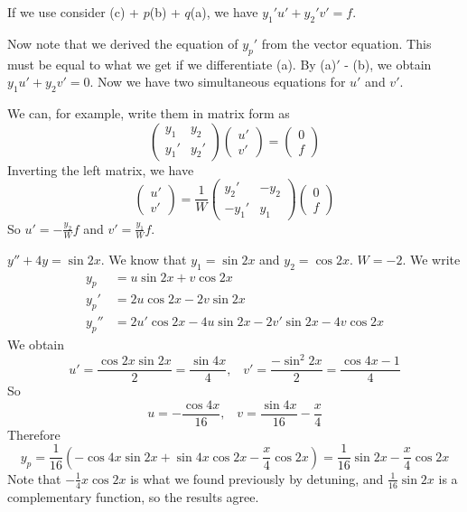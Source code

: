 \documentclass[a4paper]{article}
\begin{document}
If we use consider (c) + $p$(b) + $q$(a), we have $y_1' u' + y_2'v' = f$.

Now note that we derived the equation of $y_p'$ from the vector equation. This must be equal to what we get if we differentiate (a). By (a)$'$ - (b), we obtain $y_1u' + y_2v' = 0$. Now we have two simultaneous equations for $u'$ and $v'$.

We can, for example, write them in matrix form as
\[
\begin{pmatrix}
  y_1 & y_2\\
  y_1' & y_2'
\end{pmatrix}
\begin{pmatrix}
  u'\\
  v'
\end{pmatrix}
=
\begin{pmatrix}
  0\\
  f
\end{pmatrix}
\]
Inverting the left matrix, we have
\[
\begin{pmatrix}
  u'\\
  v'
\end{pmatrix} = \frac{1}{W}
\begin{pmatrix}
  y_2' & -y_2\\
  -y_1' & y_1
\end{pmatrix}
\begin{pmatrix}
  0\\f
\end{pmatrix}
\]
So $u' = -\frac{y_2}{W}f$ and $v' = \frac{y_1}{W}f$.

\begin{eg}
  $y'' + 4y = \sin 2x$. We know that $y_1 = \sin 2x$ and $y_2 = \cos 2x$. $W = -2$. We write
\begin{align*}
  y_p &= u\sin 2x + v\cos 2x\\
  y_p' &= 2u\cos 2x - 2v\sin 2x\\
  y_p'' &= 2u'\cos 2x - 4u\sin 2x - 2v' \sin 2x - 4v\cos 2x
\end{align*}
We obtain 
\[
u' = \frac{\cos 2x\sin 2x}{2} = \frac{\sin 4x}{4},\;\;\; v' = \frac{-\sin^2 2x}{2} = \frac{\cos 4x - 1}{4}
\]
So 
\[
u = -\frac{\cos 4x}{16}, \;\;\; v = \frac{\sin 4x}{16} - \frac{x}{4}
\]
Therefore
\[
y_p = \frac{1}{16}(-\cos 4x\sin 2x + \sin 4x\cos 2x - \frac{x}{4}\cos 2x) = \frac{1}{16}\sin 2x - \frac{x}{4}\cos 2x
\]
Note that $-\frac{1}{4}x\cos 2x$ is what we found previously by detuning, and $\frac{1}{16}\sin 2x$ is a complementary function, so the results agree.
\end{eg}
\end{document}
